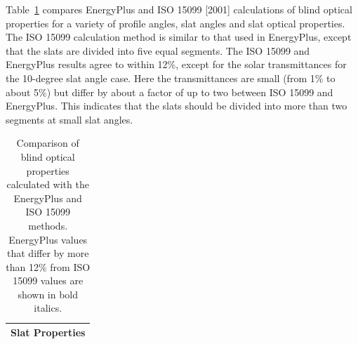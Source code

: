 Table~\ref{table:comparison-of-blind-optical-properties} compares EnergyPlus and ISO 15099 {[}2001{]} calculations of blind optical properties for a variety of profile angles, slat angles and slat optical properties. The ISO 15099 calculation method is similar to that used in EnergyPlus, except that the slats are divided into five equal segments. The ISO 15099 and EnergyPlus results agree to within 12\%, except for the solar transmittances for the 10-degree slat angle case. Here the transmittances are small (from 1\% to about 5\%) but differ by about a factor of up to two between ISO 15099 and EnergyPlus. This indicates that the slats should be divided into more than two segments at small slat angles.

\begin{longtable}[c]{p{1.0in}p{0.4in}p{0.4in}p{0.4in}p{0.4in}p{0.4in}p{0.4in}p{0.4in}p{0.4in}p{0.4in}p{0.4in}}
\caption{Comparison of blind optical properties calculated with the EnergyPlus and ISO 15099 methods. EnergyPlus values that differ by more than 12\% from ISO 15099 values are shown in bold italics. \label{table:comparison-of-blind-optical-properties}} \tabularnewline
\toprule 
\multicolumn{11}{l}{\textbf{Slat Properties}} \tabularnewline
\midrule
\endfirsthead


\end{longtable}
